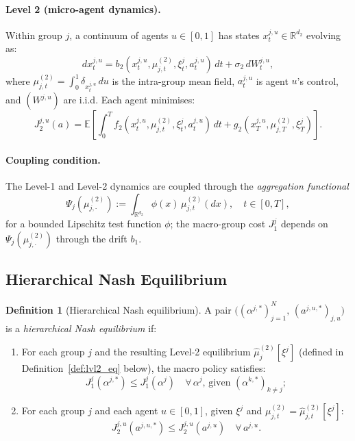 \documentclass[12pt,a4paper]{article}
\theoremstyle{plain}
\theoremstyle{definition}
\newtheorem{definition}[theorem]{Definition}
\newcommand{\R}{\mathbb{R}}
\newcommand{\E}{\mathbb{E}}
\newcommand{\1}{\mathbbm{1}}
\begin{document}
\paragraph{Level 2 (micro-agent dynamics).}
Within group $j$, a continuum of agents $u \in [0,1]$ has states
$x^{j,u}_t \in \R^{d_2}$ evolving as:
\begin{equation}
\label{eq:level2_sde}
dx^{j,u}_t = b_2(x^{j,u}_t, \mu^{(2)}_{j,t}, \xi^j_t, a^{j,u}_t)\,dt
             + \sigma_2\,dW^{j,u}_t,
\end{equation}
where $\mu^{(2)}_{j,t} = \int_0^1 \delta_{x^{j,u}_t}\,du$ is the intra-group
mean field, $a^{j,u}_t$ is agent $u$'s control, and $(W^{j,u})$ are i.i.d.
Each agent minimises:
\begin{equation}
\label{eq:level2_cost}
J_2^{j,u}(a) = \E\!\left[\int_0^T f_2(x^{j,u}_t, \mu^{(2)}_{j,t}, \xi^j_t, a^{j,u}_t)\,dt
                          + g_2(x^{j,u}_T, \mu^{(2)}_{j,T}, \xi^j_T)\right].
\end{equation}

\paragraph{Coupling condition.}
The Level-1 and Level-2 dynamics are coupled through the \emph{aggregation
functional}
\begin{equation}
\label{eq:agg}
\Psi_j\!\left(\mu^{(2)}_{j,\cdot}\right)
:= \int_{\R^{d_2}} \phi(x)\,\mu^{(2)}_{j,t}(dx), \quad t \in [0,T],
\end{equation}
for a bounded Lipschitz test function $\phi$; the macro-group cost $J_1^j$
depends on $\Psi_j(\mu^{(2)}_{j,\cdot})$ through the drift $b_1$.

\subsection{Hierarchical Nash Equilibrium}

\begin{definition}[Hierarchical Nash equilibrium]
\label{def:hier_nash}
A pair $\bigl((\alpha^{j,*})_{j=1}^N,\, (a^{j,u,*})_{j,u}\bigr)$ is a
\emph{hierarchical Nash equilibrium} if:
\begin{enumerate}[label=(\roman*)]
\item For each group $j$ and the resulting Level-2 equilibrium
  $\hat{\mu}^{(2)}_j[\xi^j]$ (defined in Definition~\ref{def:lvl2_eq} below),
  the macro policy satisfies:
  \[
  J_1^j(\alpha^{j,*}) \leq J_1^j(\alpha^j)
  \quad \forall\,\alpha^j,\, \text{given } (\alpha^{k,*})_{k\neq j};
  \]
\item For each group $j$ and each agent $u \in [0,1]$, given $\xi^j$ and
  $\mu^{(2)}_{j,t} = \hat{\mu}^{(2)}_{j,t}[\xi^j]$:
  \[
  J_2^{j,u}(a^{j,u,*}) \leq J_2^{j,u}(a^{j,u}) \quad \forall\, a^{j,u}.
  \]
\end{enumerate}
\end{definition}
\end{document}
